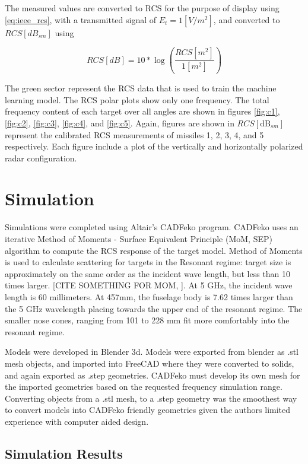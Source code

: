     The measured values are converted to RCS for the purpose of display using \ref{eq:ieee_rcs}, with a transmitted signal of $E_t = 1 [V/m^2]$, and converted to $RCS [dB_{sm}]$ using

    \begin{equation}
      RCS [dB] = 10 * \log \left( \frac{RCS [m^2]}{1 [m^2]}\right)
    \end{equation}

    The green sector represent the RCS data that is used to train the machine learning model. The RCS polar plots show only one frequency. The total frequency content of each target over all angles are shown in figures \ref{fig:c1}, \ref{fig:c2}, \ref{fig:c3}, \ref{fig:c4}, and \ref{fig:c5}. Again, figures are shown in $RCS [\textrm{dB}_{sm}]$ represent the calibrated RCS measurements of missiles 1, 2, 3, 4, and 5 respectively. Each figure include a plot of the vertically and horizontally polarized radar configuration.

\section{Simulation}

  Simulations were completed using Altair's CADFeko program. CADFeko uses an iterative Method of Moments - Surface Equivalent Principle (MoM, SEP) algorithm to compute the RCS response of the target model. Method of Moments is used to calculate scattering for targets in the Resonant regime:  target size is approximately on the same order as the incident wave length, but less than 10 times larger. [CITE SOMETHING FOR MOM, \cite{Knott}]. At 5 GHz, the incident wave length is 60 millimeters. At 457mm, the fuselage body is 7.62 times larger than the 5 GHz wavelength placing towards the upper end of the resonant regime. The smaller nose cones, ranging from 101 to 228 mm fit more comfortably into the resonant regime.

  Models were developed in Blender 3d. Models were exported from blender as .stl mesh objects, and imported into FreeCAD where they were converted to solids, and again exported as .step geometries. CADFeko must develop its own mesh for the imported geometries based on the requested frequency simulation range. Converting objects from a .stl mesh, to a .step geometry was the smoothest way to convert models into CADFeko friendly geometries given the authors limited experience with computer aided design.

  \subsection{Simulation Results}

